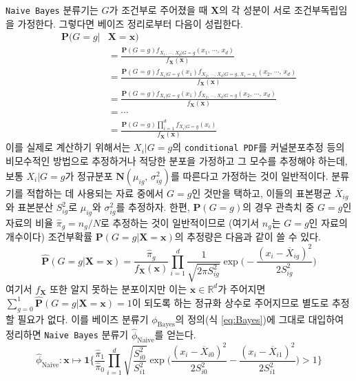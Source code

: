 \documentclass[11pt,onecolumn,twoside,a4size]{gsag3jnl}
\begin{document}
\texttt{Naive Bayes} 분류기는 $G$가 조건부로 주어졌을 때 $\mathbf{X}$의 각 성분이 서로 조건부독립임을 가정한다. 그렇다면 베이즈 정리로부터 다음이 성립한다.
\begin{align}
  \mathbf{P}(G=g\vert&\mathbf{X}=\mathbf{x})\\
  &=\frac{\mathbf{P}(G=g)f_{X_1,\,\cdots,\,X_d\vert G=g}(x_1,\,\cdots,\,x_d)}{f_{\mathbf{X}}(\mathbf{x})}\nonumber\\
  &=\frac{\mathbf{P}(G=g)f_{X_1\vert G=g}(x_1)f_{X_2,\,\cdots,\,X_d\vert G=g,\,X_1=x_1}(x_2,\,\cdots,\,x_d)}{f_{\mathbf{X}}(\mathbf{x})}\nonumber\\
  &=\frac{\mathbf{P}(G=g)f_{X_1\vert G=g}(x_1)f_{X_2,\,\cdots,\,X_d\vert G=g}(x_2,\,\cdots,\,x_d)}{f_{\mathbf{X}}(\mathbf{x})}\nonumber\\
  &=\cdots\nonumber\\
  &=\frac{\mathbf{P}(G=g)\prod_{i=1}^df_{X_i\vert G=g}(x_i)}{f_{\mathbf{X}}(\mathbf{x})}\nonumber
\end{align}
이를 실제로 계산하기 위해서는 $X_i\vert G=g$의 \texttt{conditional PDF}를 커널분포추정 등의 비모수적인 방법으로 추정하거나 적당한 분포을 가정하고 그 모수를 추정해야 하는데, 보통 $X_i\vert G=g$가 정규분포 $\mathbf{N}(\mu_{ig},\,\sigma_{ig}^2)$를 따른다고 가정하는 것이 일반적이다. 분류기를 적합하는 데 사용되는 자료 중에서 $G=g$인 것만을 택하고, 이들의 표본평균 $\overline{X}_{ig}$와 표본분산 $S_{ig}^2$로 $\mu_{ig}$와 $\sigma_{ig}^2$를 추정하자. 한편, $\mathbf{P}(G=g)$의 경우 관측치 중 $G=g$인 자료의 비율 $\widehat{\pi}_g=n_g/N$로 추정하는 것이 일반적이므로 (여기서 $n_g$는 $G=g$인 자료의 개수이다) 조건부확률 $\mathbf{P}(G=g\vert\mathbf{X}=\mathbf{x})$의 추정량은 다음과 같이 쓸 수 있다.
\begin{equation}
  \widehat{\mathbf{P}}(G=g\vert\mathbf{X}=\mathbf{x})=\frac{\widehat{\pi}_g}{f_{\mathbf{X}}(\mathbf{x})}\prod_{i=1}^d\frac{1}{\sqrt{2\pi S^2_{ig}}}\exp\bigg(-\frac{(x_i-\overline{X}_{ig})^2}{2S^2_{ig}}\bigg)
\end{equation}
여기서 $f_{\mathbf{X}}$ 또한 알지 못하는 분포이지만 이는 $\mathbf{x}\in\mathbb{R}^d$가 주어지면 $\sum_{g=0}^1\widehat{\mathbf{P}}(G=g\vert\mathbf{X}=\mathbf{x})=1$이 되도록 하는 정규화 상수로 주어지므로 별도로 추정할 필요가 없다. 이를 베이즈 분류기 $\phi_\mathrm{Bayes}$의 정의(식 \ref{eq:Bayes})에 그대로 대입하여 정리하면 \texttt{Naive Bayes} 분류기 $\widehat{\phi}_\mathrm{Naive}$를 얻는다.
\begin{equation}
  \widehat{\phi}_\mathrm{Naive}:\mathbf{x}\mapsto\mathbf{1}\bigg\{\frac{\widehat{\pi}_1}{\widehat{\pi}_0}\prod_{i=1}^d\sqrt{\frac{S^2_{i0}}{S^2_{i1}}}\exp\bigg(\frac{(x_i-\overline{X}_{i0})^2}{2S_{i0}^2}-\frac{(x_i-\overline{X}_{i1})^2}{2S_{i1}^2}\bigg)>1\bigg\}
\end{equation}
\end{document}
